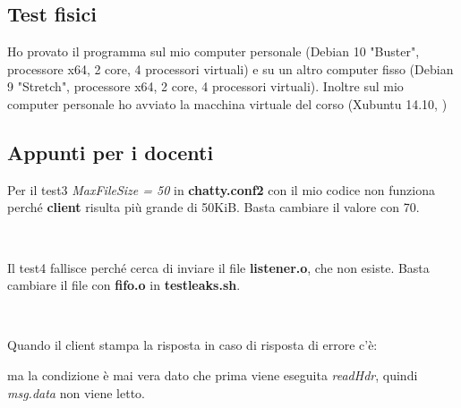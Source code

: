 \documentclass[a4paper]{article}
\theoremstyle{theorem}
\theoremstyle{remark}
\theoremstyle{definition}
\theoremstyle{corollary}
\theoremstyle{lemma}
\newcommand\file[1]{%
	\textbf{#1}}
\newcommand\codeName[1]{%
	\textit{#1}}
\begin{document}
\subsection{Test fisici}
Ho provato il programma sul mio computer personale (Debian 10 "Buster", processore x64, 2 core, 4 processori virtuali) e su un altro computer fisso (Debian 9 "Stretch", processore x64, 2 core, 4 processori virtuali). Inoltre sul mio computer personale ho avviato la macchina virtuale del corso (Xubuntu 14.10, )

\subsection{Appunti per i docenti}
Per il test3 \textit{MaxFileSize = 50} in \file{chatty.conf2} con il mio codice non funziona perché \file{client} risulta più grande di 50KiB. Basta cambiare il valore con 70.
\

\

Il test4 fallisce perché cerca di inviare il file \file{listener.o}, che non esiste. Basta cambiare il file con \file{fifo.o} in \file{testleaks.sh}.
\

\

Quando il client stampa la risposta in caso di risposta di errore c'è:

ma la condizione è mai vera dato che prima viene eseguita \codeName{readHdr}, quindi \codeName{msg.data} non viene letto.
\end{document}
